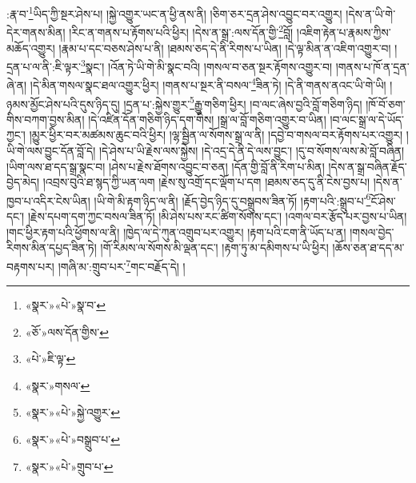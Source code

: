 :རྣ་བ་\footnote{«སྣར་»«པེ་»སྣ་བ་}ཡིད་ཀྱི་སྔར་ཤེས་པ། །སྐྱེ་འགྱུར་ཡང་ན་ཕྱི་ནས་ནི། །ཅིག་ཅར་དྲན་ཤེས་འབྱུང་བར་འགྱུར། །དེས་ན་ཡི་གེ་དེར་གནས་མིན། །རིང་ན་གནས་པ་རྟོགས་པའི་ཕྱིར། །དེས་ན་སྒྲ་:ལས་དོན་གྱི་\footnote{«ཅོ་»ལས་དོན་གྱིས་}བློ། །འཇིག་རྟེན་པ་རྣམས་ཀྱིས་མཆོད་འགྱུར། །རྣམ་པ་དང་བཅས་ཤེས་པ་ནི། །ཐམས་ཅད་དེ་ནི་རིགས་པ་ཡིན། །དེ་ལྟ་མིན་ན་འཇིག་འགྱུར་བ། །དྲན་པ་ལ་ནི་:ཇི་ལྟར་\footnote{«པེ་»ཇི་ལྟ་}སྣང་། །འོན་ཏེ་ཡི་གེ་མི་སྣང་བའི། །གསལ་བ་ཅན་སྔར་རྟོགས་འགྱུར་བ། །གནས་པ་ཁོ་ན་དྲན་ཞེ་ན། །དེ་མིན་གསལ་སྣང་ཐལ་འགྱུར་ཕྱིར། །གནས་པ་སྔར་ནི་བསལ་\footnote{«སྣར་»གསལ་}ཟིན་ཏེ། །དེ་ནི་གནས་ནའང་ཡི་གེ་ཡི། །ཉམས་མྱོང་ཤེས་པའི་དུས་ཉིད་དུ། །དྲན་པ་:སྐྱེས་གྱུར་\footnote{«སྣར་»«པེ་»སྐྱེ་འགྱུར་}རྒྱུ་གཅིག་ཕྱིར། །བ་ལང་ཞེས་བྱའི་བློ་གཅིག་ཉིད། །ཁོ་བོ་ཅག་གིས་བཀག་བྱས་མིན། །དེ་འཛིན་དོན་གཅིག་ཉིད་དག་གིས། །སྒྲ་ལ་བློ་གཅིག་འགྱུར་བ་ཡིན། །བ་ལང་སྒྲ་ལ་དེ་ཡོད་ཀྱང་། །མྱུར་ཕྱིར་བར་མཚམས་ཆུང་བའི་ཕྱིར། །ལྷ་སྦྱིན་ལ་སོགས་སྒྲ་ལ་ནི། །དབྱེ་བ་གསལ་བར་རྟོགས་པར་འགྱུར། །ཡི་གེ་ལས་བྱུང་དོན་བློ་དེ། །དེ་ཤེས་པ་ཡི་རྗེས་ལས་སྐྱེས། །དེ་འདྲ་དེ་ནི་དེ་ལས་བྱུང་། །དུ་བ་སོགས་ལས་མེ་བློ་བཞིན། །ཡིག་ལས་ཐ་དད་སྒྲ་སྣང་བ། །ཤེས་པ་རྗེས་ཐོགས་འབྱུང་བ་ཅན། །དོན་གྱི་བློ་ནི་རིག་པ་མིན། །དེས་ན་སྒྲ་བཞིན་རྗོད་བྱེད་མེད། །འབྲས་བུའི་ཐ་སྙད་ཀྱི་ཡན་ལག །རྗེས་སུ་འགྲོ་དང་ལྡོག་པ་དག །ཐམས་ཅད་དུ་ནི་ངེས་བྱས་པ། །དེས་ན་ཁྱབ་པ་འདིར་ངེས་ཡིན། །ཡི་གེ་མི་རྟག་ཉིད་ལ་ནི། །རྗོད་བྱེད་ཉིད་དུ་བསྒྲུབས་ཟིན་ཏོ། །རྟག་པའི་:སྒྲུབ་པ་\footnote{«སྣར་»«པེ་»བསྒྲུབ་པ་}ངོ་ཤེས་དང་། །རྗེས་དཔག་དག་ཀྱང་བསལ་ཟིན་ཏོ། །མི་ཤེས་པས་རང་ཚིག་སོགས་དང་། །འགལ་བར་རྩོད་པར་བྱས་པ་ཡིན། །གང་ཕྱིར་རྟག་པའི་ཕྱོགས་ལ་ནི། །ཁྱེད་ལ་དེ་ཀུན་འགྲུབ་པར་འགྱུར། །རྟག་པའི་ངག་ནི་ཡོད་པ་ན། །གསལ་བྱེད་རིགས་མིན་དཔྱད་ཟིན་ཏེ། །གོ་རིམས་ལ་སོགས་མི་ལྡན་དང་། །རྟག་ཏུ་མ་དམིགས་པ་ཡི་ཕྱིར། །ཆོས་ཅན་ཐ་དད་མ་བརྟགས་པར། །གཞི་མ་:གྲུབ་པར་\footnote{«སྣར་»«པེ་»གྲུབ་པ་}གང་བརྗོད་དེ། །
